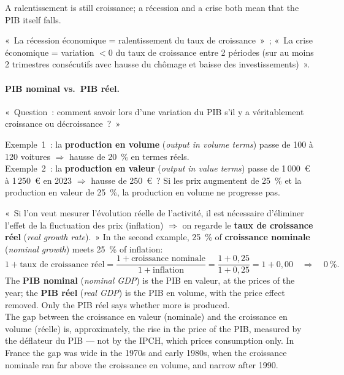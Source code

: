 A ralentissement is still croissance; a récession and a crise both mean that
the PIB itself falls.

\begin{remark}
  «~La récession économique = ralentissement du taux de croissance~»~; «~La crise
  économique = variation $< 0$ du taux de croissance entre 2 périodes (sur au
  moins 2 trimestres consécutifs avec hausse du chômage et baisse des
  investissements)~».
\end{remark}

\paragraph{PIB nominal vs.\ PIB réel.} «~Question~: comment savoir lors d'une
variation du PIB s'il y a véritablement croissance ou décroissance~?~»

\begin{example}
  Exemple~1~: la \textbf{production en volume} (\textit{output in volume terms})
  passe de 100 à 120 voitures $\Rightarrow$ hausse de 20~\% en termes réels.\\
  Exemple~2~: la \textbf{production en valeur} (\textit{output in value terms})
  passe de 1\,000~€ à 1\,250~€ en 2023 $\Rightarrow$ hausse de 250~€~? Si les prix
  augmentent de 25~\% et la production en valeur de 25~\%, la production en
  volume ne progresse pas.
\end{example}

«~Si l'on veut mesurer l'évolution réelle de l'activité, il est nécessaire
d'éliminer l'effet de la fluctuation des prix (inflation) $\Rightarrow$ on
regarde le \textbf{taux de croissance réel} (\textit{real growth rate}).~» In the
second example, 25~\% of \textbf{croissance nominale} (\textit{nominal growth})
meets 25~\% of inflation:
\[
  1 + \text{taux de croissance réel}
  = \frac{1 + \text{croissance nominale}}{1 + \text{inflation}}
  = \frac{1 + 0{,}25}{1 + 0{,}25} = 1 + 0{,}00
  \quad\Rightarrow\quad 0~\%.
\]
The \textbf{PIB nominal} (\textit{nominal GDP}) is the PIB en valeur, at the
prices of the year; the \textbf{PIB réel} (\textit{real GDP}) is the PIB en
volume, with the price effect removed. Only the PIB réel says whether more is
produced.\\

The gap between the croissance en valeur (nominale) and the croissance en
volume (réelle) is, approximately, the rise in the price of the PIB, measured by
the déflateur du PIB --- not by the IPCH, which prices consumption only. In
France the gap was wide in the 1970s and early 1980s, when the croissance
nominale ran far above the croissance en volume, and narrow after 1990.

